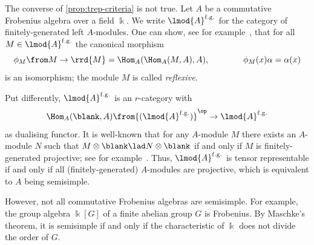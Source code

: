 \begin{example}\label{ex:r-cat-not-always-trep}
  The converse of \cref{prop:trep-criteria} is not true.
  Let \(A\) be a commutative Frobenius algebra over a field \(\Bbbk\).
  We write \(\lmod{A}^{\mathrm{f.g.}}\) for the category of finitely\hyp{}generated left \(A\)\hyp{}modules.
  One can show, see for example~\cite[Sections~15 and~16]{Lam1999}, that for all \(M \in \lmod{A}^{\mathrm{f.g.}}\) the canonical morphism
  \[
    \phi_M \from M \to \rrd{M} = \Hom_A(\Hom_A(M,A),A) , \qquad \qquad \phi_M(x)\alpha = \alpha(x)
  \]
  is an isomorphism;
  the module \(M\) is called \emph{reflexive}.

  Put differently, \(\lmod{A}^{\mathrm{f.g.}}\) is an \(r\)\hyp{}category with
  \[
    \Hom_A(\blank,A) \from {(\lmod{A}^{\mathrm{f.g.}})}^{\op} \to \lmod{A}^{\mathrm{f.g.}}
  \]
  as dualising functor.
  It is well-known that
  for any \(A\)\hyp{}module \(M\)
  there exists an \(A\)\hyp{}module \(N\)
  such that \(M \otimes \blank \lad N \otimes \blank\) if and only if \(M\) is finitely\hyp{}generated projective;
  see for example~\cite[Proposition~2.1]{niefield17:coexp}.
  Thus, \(\lmod{A}^{\mathrm{f.g.}}\) is tensor representable if and only if
  all (finitely\hyp{}generated) \(A\)\hyp{}modules are projective,
  which is equivalent to \(A\) being semisimple.

  However, not all commutative Frobenius algebras are semisimple.
  For example, the group algebra \(\Bbbk[G]\) of a finite abelian group \(G\) is Frobenius.
  By Maschke's theorem, it is semisimple if and only if the characteristic of \(\Bbbk\) does not divide the order of \(G\).
\end{example}

